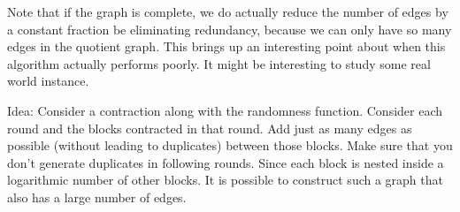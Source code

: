 \begin{teachnote}
Note that if the graph is complete, we do actually reduce the number
of edges by a constant fraction be eliminating redundancy, because we
can only have so many edges in the quotient graph. This brings up an
interesting point about when this algorithm actually performs poorly.
It might be interesting to study some real world instance.
\end{teachnote}

\begin{teachnote}
Idea: Consider a contraction along with the randomness function.
Consider each round and the blocks contracted in that round.
Add just as many edges as possible (without leading to duplicates)
between those blocks.  Make sure that you don't generate duplicates
in following rounds.  Since each block is nested inside a
logarithmic number of other blocks.  It is possible to construct
such a graph that also has a large number of edges.
\end{teachnote}

